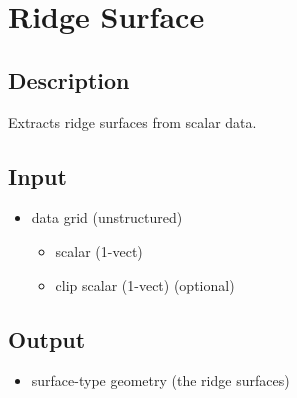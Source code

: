 \section{Ridge Surface}
\label{sec:ridge-surface}


\subsection{Description}
Extracts ridge surfaces from scalar data.

\subsection{Input}
\begin{itemize}
\item
  data grid (unstructured)
  \begin{itemize}
  \item
    scalar (1-vect)
  \item
    clip scalar (1-vect) (optional)
  \end{itemize}
\end{itemize}


\subsection{Output}
\begin{itemize}
\item
  surface-type geometry (the ridge surfaces)
\end{itemize}


